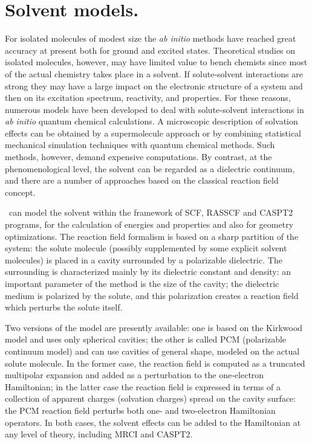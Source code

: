 \section{Solvent models.}
\label{TUT:sec:cavity}
For isolated molecules of modest size the {\em ab initio} methods
have reached great accuracy at present both for ground and
excited states. Theoretical studies on isolated molecules, however, 
may have limited value to bench chemists since most of the 
actual chemistry takes place in a solvent. If solute{-}solvent interactions are
strong they may have a large impact on the electronic structure of a
system and then on its excitation spectrum, reactivity, and properties. 
For these reasons, numerous models
have been developed to deal with solute{-}solvent interactions in {\em ab
initio} quantum chemical calculations. A microscopic
description of solvation effects can be obtained by a supermolecule
approach or by combining statistical mechanical simulation techniques
with quantum chemical methods. 
Such methods, however, demand expensive computations. By contrast, at the 
phenomenological level, the solvent can be regarded as a dielectric continuum, 
and there are a number of approaches \cite{Cossi:98,Cossi:01,Karlstroem:88,
Serrano:97b,Tomasi:94} based on the classical reaction field concept. 

\molcas\ can model the solvent 
within the framework of SCF, RASSCF and CASPT2 programs, for the calculation of energies
and properties and also for geometry optimizations. The reaction field formalism
is based on a sharp partition of the system: the solute molecule (possibly 
supplemented by some explicit solvent molecules) is placed in a cavity 
surrounded by a polarizable dielectric.
The surrounding is characterized mainly by its dielectric constant and density:
an important parameter of the method is the size of the cavity; 
the dielectric medium is polarized by the solute, and this polarization creates 
a reaction field which perturbs the solute itself.

Two versions of the model are presently available: one is based on the Kirkwood model
\cite{Karlstroem:88,Serrano:97b} and uses only spherical cavities; the other is
called PCM (polarizable continuum model) \cite{Cossi:98,Cossi:01} and can
use cavities of general shape, modeled on the actual solute molecule. In the former 
case, the reaction field is computed as a truncated multipolar expansion and added
as a perturbation to the one-electron Hamiltonian; in the latter case the reaction
field is expressed in terms of a collection of apparent charges (solvation charges)
spread on the cavity surface: the PCM reaction field perturbs both one- and 
two-electron Hamiltonian operators. In both cases, the solvent effects can be
added to the Hamiltonian at any level of theory, including MRCI and CASPT2.

